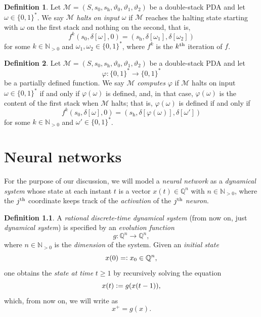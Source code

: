 \documentclass{book}
\newcommand{\defeq}{\vcentcolon=}
\newcommand{\eqdef}{=\vcentcolon}
\newcommand{\Q}{\mathbb{Q}}
\newcommand{\h}{\mathrm{h}}
\theoremstyle{definition}
\newtheorem{definition}{Definition}[chapter]
\theoremstyle{plain}
\theoremstyle{plain}
\theoremstyle{remark}
\theoremstyle{plain}
\begin{document}
	\begin{definition}
		Let $\mathcal{M}=(S,s_0,s_\h,\vartheta_0,\vartheta_1,\vartheta_2)$ be a double-stack PDA and let $\omega\in\{0,1\}^*$. We say $\mathcal{M}$ \emph{halts on input} $\omega$ if $\mathcal{M}$ reaches the halting state starting with $\omega$ on the first stack and nothing on the second, that is,
		$$
			f^k(s_0,\delta[\omega],0)=(s_\h,\delta[\omega_1],\delta[\omega_2])
		$$
		for some $k\in\mathbb{N}_{>0}$ and $\omega_1,\omega_2\in\{0,1\}^*$, where $f^k$ is the $k\textsuperscript{th}$ iteration of $f$.
	\end{definition}
	
	\begin{definition}	\label{def:computed}
		Let $\mathcal{M}=(S,s_0,s_\h,\vartheta_0,\vartheta_1,\vartheta_2)$ be a double-stack PDA and let $$\varphi:\{0,1\}^* \to \{0,1\}^*$$ be a partially defined function. We say $\mathcal{M}$ \emph{computes} $\varphi$ if $\mathcal{M}$ halts on input $\omega\in\{0,1\}^*$ if and only if $\varphi(\omega)$ is defined, and, in that case, $\varphi(\omega)$ is the content of the first stack when $\mathcal{M}$ halts; that is, $\varphi(\omega)$ is defined if and only if
		$$
			f^k(s_0,\delta[\omega],0)=(s_\h,\delta[\varphi(\omega)],\delta[\omega'])
		$$
		for some $k\in\mathbb{N}_{>0}$ and $\omega'\in\{0,1\}^*$.
	\end{definition}
	
	\chapter{Neural networks}
	For the purpose of our discussion, we will model a \emph{neural network} as a \emph{dynamical system} whose state at each instant $t$ is a vector $x(t) \in \Q^n$ with $n \in \mathbb{N}_{>0}$, where the $j\textsuperscript{th}$ coordinate keeps track of the \emph{activation} of the $j\textsuperscript{th}$ \emph{neuron}.
	
	\begin{definition}
		A \emph{rational discrete-time dynamical system} (from now on, just \emph{dynamical system}) is specified by an \emph{evolution function} $$g:\Q^n \to \Q^n,$$ where $n \in \mathbb{N}_{>0}$ is the \emph{dimension} of the system. Given an \emph{initial state} $$x(0) \eqdef x_0 \in \Q^n,$$ one obtains the \emph{state at time} $t \geq 1$ by recursively solving the equation $$x(t) \defeq g(x(t-1)),$$ which, from now on, we will write as $$x^+=g(x).$$
	\end{definition}
	
\end{document}
